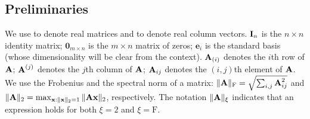 \subsection{Preliminaries}
\label{sec:preliminaries}

We use \math{\matA,\matB,\ldots} to denote real matrices and \math{\a,\b,\ldots} to denote real column vectors.
${\bm{\mathrm{I}}}_{n}$ is the $n \times n$ identity matrix;  $\bm{0}_{m \times n}$ is the $m \times n$ matrix of zeros; $\bm{e}_i$ is the standard basis (whose dimensionality will be clear from the context). ${\bm{\mathrm{A}}}_{(i)}$ denotes the $i$th row of ${\bm{\mathrm{A}}}$; ${\bm{\mathrm{A}}}^{(j)}$ denotes the $j$th column of ${\bm{\mathrm{A}}}$; ${\bm{\mathrm{A}}}_{ij}$ denotes the $(i,j)$th element of ${\bm{\mathrm{A}}}$.
We use the Frobenius and the spectral norm of a matrix: $ \mbox{}\|{\bm{\mathrm{A}}}\|_\mathrm{F} = \sqrt{\sum_{i,j} {\bm{\mathrm{A}}}_{ij}^2}$ and $\mbox{}\|{\bm{\mathrm{A}}}\|_2 = \max_{{\mathbf x}:\mbox{}\|{\mathbf x}\|_2=1}\mbox{}\|{\bm{\mathrm{A}}} {\mathbf x}\|_2$, respectively.
The notation $\mbox{}\|{\bm{\mathrm{A}}}\|_{\xi}$ indicates that an expression holds for both $\xi = 2$ and $\xi = \mathrm{F}$.

